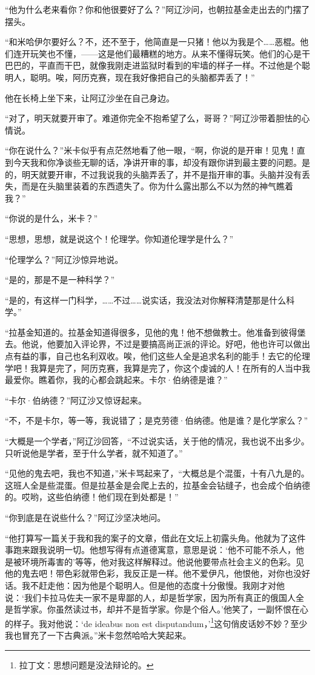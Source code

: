 \par “他为什么老来看你？你和他很要好了么？”阿辽沙问，也朝拉基金走出去的门摆了摆头。
\par “和米哈伊尔要好么？不，还不至于，他简直是一只猪！他以为我是个……恶棍。他们连开玩笑也不懂，——这是他们最糟糕的地方。从来不懂得玩笑。他们的心是干巴巴的，平直而干巴，就像我刚走进监狱时看到的牢墙的样子一样。不过他是个聪明人，聪明。唉，阿历克赛，现在我好像把自己的头脑都弄丢了！”
\par 他在长椅上坐下来，让阿辽沙坐在自己身边。
\par “对了，明天就要开审了。难道你完全不抱希望了么，哥哥？”阿辽沙带着胆怯的心情说。
\par “你在说什么？”米卡似乎有点茫然地看了他一眼，“啊，你说的是开审！见鬼！直到今天我和你净谈些无聊的话，净讲开审的事，却没有跟你讲到最主要的问题。是的，明天就要开审，不过我说我的头脑弄丢了，并不是指开审的事。头脑并没有丢失，而是在头脑里装着的东西遗失了。你为什么露出那么不以为然的神气瞧着我？”
\par “你说的是什么，米卡？”
\par “思想，思想，就是说这个！伦理学。你知道伦理学是什么？”
\par “伦理学么？”阿辽沙惊异地说。
\par “是的，那是不是一种科学？”
\par “是的，有这样一门科学，……不过……说实话，我没法对你解释清楚那是什么科学。”
\par “拉基金知道的。拉基金知道得很多，见他的鬼！他不想做教士。他准备到彼得堡去。他说，他要加入评论界，不过是要搞高尚正派的评论。好吧，他也许可以做出点有益的事，自己也名利双收。唉，他们这些人全是追求名利的能手！去它的伦理学吧！我算是完了，阿历克赛，我算是完了，你这个虔诚的人！在所有的人当中我最爱你。瞧着你，我的心都会跳起来。卡尔·伯纳德是谁？”
\par “卡尔·伯纳德？”阿辽沙又惊讶起来。
\par “不，不是卡尔，等一等，我说错了；是克劳德·伯纳德。他是谁？是化学家么？”
\par “大概是一个学者，”阿辽沙回答，“不过说实话，关于他的情况，我也说不出多少。只听说他是学者，至于什么学者，就不知道了。”
\par “见他的鬼去吧，我也不知道，”米卡骂起来了，“大概总是个混蛋，十有八九是的。这班人全是些混蛋。但是拉基金是会爬上去的，拉基金会钻缝子，也会成个伯纳德的。哎哟，这些伯纳德！他们现在到处都是！”
\par “你到底是在说些什么？”阿辽沙坚决地问。
\par “他打算写一篇关于我和我的案子的文章，借此在文坛上初露头角。他就为了这件事跑来跟我说明一切。他想写得有点道德寓意，意思是说：‘他不可能不杀人，他是被环境所毒害的’等等，他对我这样解释过。他说他要带点社会主义的色彩。见他的鬼去吧！带色彩就带色彩，我反正是一样。他不爱伊凡，他恨他，对你也没好话。我不赶走他：因为他是个聪明人。但是他的态度十分傲慢。我刚才对他说：‘我们卡拉马佐夫一家不是卑鄙的人，却是哲学家，因为所有真正的俄国人全是哲学家。你虽然读过书，却并不是哲学家。你是个俗人。’他笑了，一副怀恨在心的样子。我对他说：‘de ideabus non est disputandum，’\footnote{拉丁文：思想问题是没法辩论的。}这句俏皮话妙不妙？至少我也冒充了一下古典派。”米卡忽然哈哈大笑起来。
